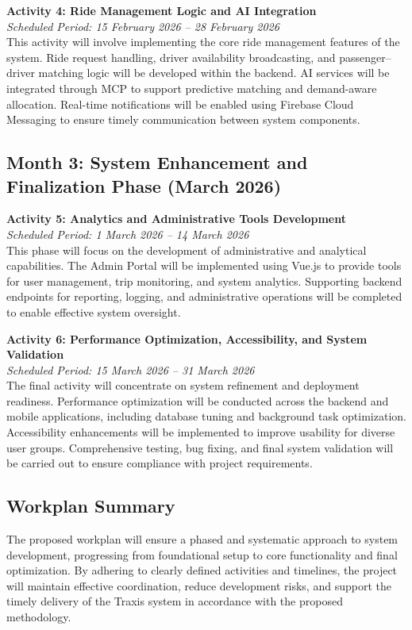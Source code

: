 \textbf{Activity 4: Ride Management Logic and AI Integration} \\
\textit{Scheduled Period: 15 February 2026 – 28 February 2026} \\
This activity will involve implementing the core ride management features of the
system. Ride request handling, driver availability broadcasting, and
passenger–driver matching logic will be developed within the backend. AI
services will be integrated through MCP to support predictive matching and
demand-aware allocation. Real-time notifications will be enabled using Firebase
Cloud Messaging to ensure timely communication between system components.


\subsection*{Month 3: System Enhancement and Finalization Phase (March 2026)}

\textbf{Activity 5: Analytics and Administrative Tools Development} \\
\textit{Scheduled Period: 1 March 2026 – 14 March 2026} \\
This phase will focus on the development of administrative and analytical
capabilities. The Admin Portal will be implemented using Vue.js to provide tools
for user management, trip monitoring, and system analytics. Supporting backend
endpoints for reporting, logging, and administrative operations will be
completed to enable effective system oversight.


\textbf{Activity 6: Performance Optimization, Accessibility, and System Validation} \\
\textit{Scheduled Period: 15 March 2026 – 31 March 2026} \\
The final activity will concentrate on system refinement and deployment
readiness. Performance optimization will be conducted across the backend and
mobile applications, including database tuning and background task optimization.
Accessibility enhancements will be implemented to improve usability for diverse
user groups. Comprehensive testing, bug fixing, and final system validation will
be carried out to ensure compliance with project requirements.


\subsection*{Workplan Summary}

The proposed workplan will ensure a phased and systematic approach to system
development, progressing from foundational setup to core functionality and final
optimization. By adhering to clearly defined activities and timelines, the
project will maintain effective coordination, reduce development risks, and
support the timely delivery of the Traxis system in accordance with the proposed
methodology.
